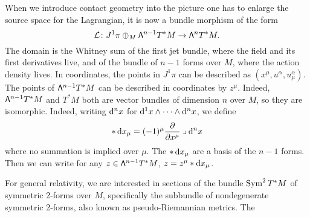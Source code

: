 \documentclass[../main.tex]{subfiles}
\begin{document}
When we introduce contact geometry into the picture one has to enlarge the source space
for the Lagrangian, it is now a bundle morphism of the form
\begin{equation*}
	\mathcal{L} \colon J^1\pi \oplus_M \mathsf{\Lambda}^{n-1}T^\ast M \to \mathsf{\Lambda}^{n} T^\ast M. 
\end{equation*}
The domain is the Whitney sum of the first jet bundle, where the field and its first
derivatives live, and of the bundle of \( n-1 \) forms over \( M \), where the action
density lives. In coordinates, the points in \( J^1\pi \) can be described as \( (x^\mu,
u^\alpha, u^\alpha_\mu) \). The points of \( \mathsf{\Lambda}^{n-1}T^\ast M \) can be described in
coordinates by \( z^\mu \). Indeed, \( \mathsf{\Lambda}^{n-1} T^\ast M \) and \( T^\ast M \) both are
vector bundles of dimension \( n \) over \( M \), so they are isomorphic. Indeed, writing
\( \mathrm{d}^n x \) for \( \mathrm{d}^1x \wedge \cdots \wedge \mathrm{d}^n x \), we define
\begin{equation*}
	\ast \,\mathrm{d} x_\mu = (-1)^\mu \frac{\partial}{\partial x^\mu} \mathbin{\lrcorner} \mathrm{d}^n x
\end{equation*}
where no summation is implied over \( \mu \). The \( \ast \,\mathrm{d} x_\mu \) are a basis of the
\( n-1 \) forms. Then we can write for any \( z \in \mathsf{\Lambda}^{n-1} T^\ast M \), \( z = z^\mu
\ast \mathrm{d} x_\mu \). 

For general relativity, we are interested in sections of the bundle \( \operatorname{Sym}^2 T^\ast M \)
of symmetric 2-forms over \( M \), specifically the subbundle of nondegenerate symmetric
2-forms, also known as pseudo-Riemannian metrics. The 
\end{document}
